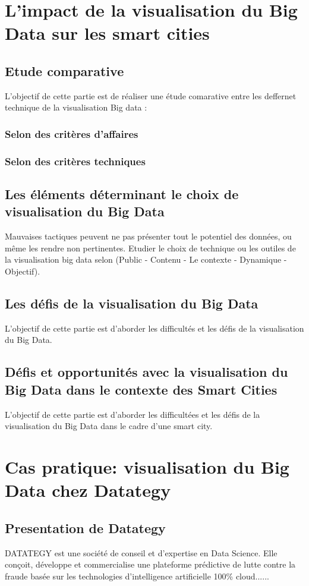 \documentclass[french, a4paper, 12pt]{report}
\begin{document}
\chapter{L'impact de la visualisation du Big Data sur les smart cities}
\section{Etude comparative }
L’objectif de cette partie est de réaliser une étude comarative entre les deffernet technique de la visualisation Big data :
\subsection{Selon des critères d'affaires}
\subsection{Selon des critères techniques}

\section{Les éléments déterminant le choix de visualisation du Big Data}
Mauvaises tactiques peuvent ne pas présenter tout le potentiel des données, ou même les rendre non pertinentes. Etudier le choix de technique ou les outiles de la visualisation big data selon (Public - Contenu - Le contexte - Dynamique - Objectif).
\section{Les défis de la visualisation du Big Data}
L’objectif de cette partie est d’aborder les difficultés et les défis de la visualisation du Big Data. 
\section{Défis et opportunités avec la visualisation du Big Data dans le contexte des Smart Cities}
L’objectif de cette partie est d’aborder les difficultées et les défis de la visualisation du Big Data dans le cadre d’une smart city. 

\chapter{Cas pratique: visualisation du Big Data chez Datategy}
\section{Presentation de Datategy}
DATATEGY est une société de conseil et d’expertise en Data Science. Elle conçoit, développe et commercialise une plateforme prédictive de lutte contre la fraude basée sur les technologies d’intelligence artificielle 100\% cloud......
\end{document}
